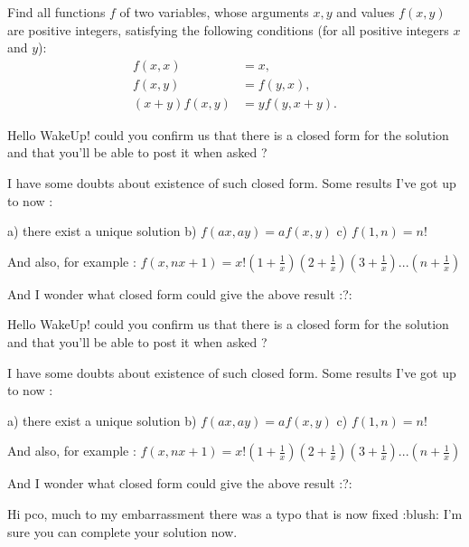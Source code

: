 \begin{solution}
	\begin{tcolorbox}Find all functions $f$ of two variables, whose arguments $x,y$ and values $f(x,y)$ are positive integers, satisfying the following conditions (for all positive integers $x$ and $y$):
\begin{align*} f(x,x)& =x,\\ f(x,y)& =f(y,x),\\ (x+y)f(x,y)& =yf(y,x+y).\end{align*}\end{tcolorbox}
Hello WakeUp! could you confirm us that there is a closed form for the solution and that you'll be able to post it when asked ?

I have some doubts about existence of such closed form.
Some results I've got up to now :

a) there exist a unique solution
b) $f(ax,ay)=af(x,y)$
c) $f(1,n)=n!$

And also, for example :
$f(x,nx+1)=x!(1+\frac 1x)(2+\frac 1x)(3+\frac 1x)...(n+\frac 1x)$

And I wonder what closed form could give the above result :?:
\end{solution}



\begin{solution}
	\begin{tcolorbox}
Hello WakeUp! could you confirm us that there is a closed form for the solution and that you'll be able to post it when asked ?

I have some doubts about existence of such closed form.
Some results I've got up to now :

a) there exist a unique solution
b) $f(ax,ay)=af(x,y)$
c) $f(1,n)=n!$

And also, for example :
$f(x,nx+1)=x!(1+\frac 1x)(2+\frac 1x)(3+\frac 1x)...(n+\frac 1x)$

And I wonder what closed form could give the above result :?:\end{tcolorbox}

Hi pco, much to my embarrassment there was a typo that is now fixed :blush:  I'm sure you can complete your solution now.
\end{solution}



